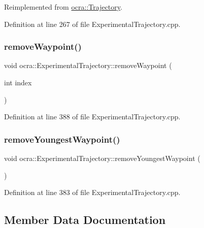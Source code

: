 Reimplemented from \hyperlink{classocra_1_1Trajectory_aa49b123abf79be71f131c138ff2a88b2}{ocra\+::\+Trajectory}.



Definition at line 267 of file Experimental\+Trajectory.\+cpp.

\hypertarget{classocra_1_1ExperimentalTrajectory_a6b5cdffc1575ca98a73251d6214521a3}{}\label{classocra_1_1ExperimentalTrajectory_a6b5cdffc1575ca98a73251d6214521a3} 
\subsubsection{\texorpdfstring{remove\+Waypoint()}{removeWaypoint()}}
{\footnotesize\ttfamily void ocra\+::\+Experimental\+Trajectory\+::remove\+Waypoint (\begin{DoxyParamCaption}\item[{int}]{index }\end{DoxyParamCaption})}



Definition at line 388 of file Experimental\+Trajectory.\+cpp.

\hypertarget{classocra_1_1ExperimentalTrajectory_a64e0ded52fdbe54ccb85f32c67824d3a}{}\label{classocra_1_1ExperimentalTrajectory_a64e0ded52fdbe54ccb85f32c67824d3a} 
\subsubsection{\texorpdfstring{remove\+Youngest\+Waypoint()}{removeYoungestWaypoint()}}
{\footnotesize\ttfamily void ocra\+::\+Experimental\+Trajectory\+::remove\+Youngest\+Waypoint (\begin{DoxyParamCaption}{ }\end{DoxyParamCaption})}



Definition at line 383 of file Experimental\+Trajectory.\+cpp.



\subsection{Member Data Documentation}
\hypertarget{classocra_1_1ExperimentalTrajectory_a56b5a0d236891f5087b81cda85aae0be}{}\label{classocra_1_1ExperimentalTrajectory_a56b5a0d236891f5087b81cda85aae0be} 
